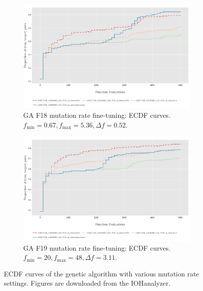 \documentclass{article}
\begin{document}
\begin{figure}[!ht]
    \begin{subfigure}[h]{0.95\linewidth}
        \includegraphics[width=\linewidth]{ga/f18/mrate_ecdf.png}
        \caption{GA F18 mutation rate fine-tuning: ECDF curves. $f_{\min} = 0.67, f_{\max} = 5.36, \Delta f = 0.52$.}
    \end{subfigure}
    \hfill
    \begin{subfigure}[h]{0.95\linewidth}
        \includegraphics[width=\linewidth]{ga/f19/mrate_ecdf.png}
        \caption{GA F19 mutation rate fine-tuning: ECDF curves. $f_{\min} = 20, f_{\max} = 48, \Delta f = 3.11$.}
    \end{subfigure}
    \caption{ECDF curves of the genetic algorithm with various mutation rate settings. Figures are downloaded from the IOHanalyzer.}
    \label{fig:experi-ga-mrate-ecdf}
\end{figure}
\end{document}
